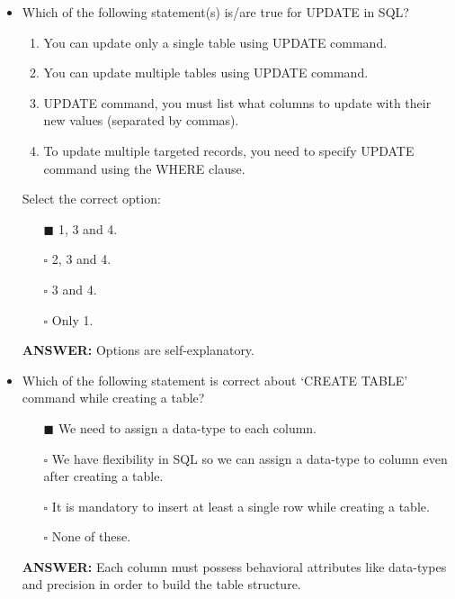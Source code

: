 \documentclass[10pt]{article}
\begin{document}
\begin{itemize}
		\item Which of the following statement(s) is/are true for UPDATE in SQL?
			\begin{enumerate}
				\item You can update only a single table using UPDATE command.
				\item You can update multiple tables using UPDATE command.
				\item UPDATE command, you must list what columns to update with their new values (separated by commas).
				\item To update multiple targeted records, you need to specify UPDATE command using the WHERE clause.
			\end{enumerate}
			Select the correct option:
			\begin{enumerate}
				\item[$\blacksquare$] 1, 3 and 4.
				\item[$\square$] 2, 3 and 4.
				\item[$\square$] 3 and 4.
				\item[$\square$] Only 1.
			\end{enumerate}
			\color{red} \textbf{ANSWER:} \color{black} Options are self-explanatory.
		
		\item Which of the following statement is correct about ‘CREATE TABLE’ command while creating a table?
			\begin{enumerate}
				\item[$\blacksquare$] We need to assign a data-type to each column.
				\item[$\square$] We have flexibility in SQL so we can assign a data-type to column even after creating a table.
				\item[$\square$] It is mandatory to insert at least a single row while creating a table.
				\item[$\square$] None of these.
			\end{enumerate}
			\color{red} \textbf{ANSWER:} \color{black} Each column must possess behavioral attributes like data-types and precision in order to build the table structure.


\end{itemize}
\end{document}
